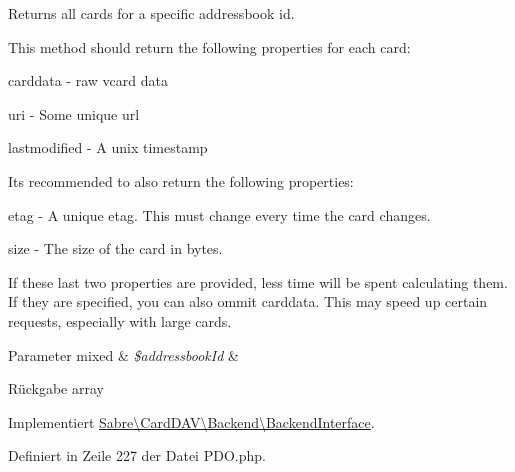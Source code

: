 Returns all cards for a specific addressbook id.

This method should return the following properties for each card\+:
\begin{DoxyItemize}
\item carddata -\/ raw vcard data
\item uri -\/ Some unique url
\item lastmodified -\/ A unix timestamp
\end{DoxyItemize}

It\textquotesingle{}s recommended to also return the following properties\+:
\begin{DoxyItemize}
\item etag -\/ A unique etag. This must change every time the card changes.
\item size -\/ The size of the card in bytes.
\end{DoxyItemize}

If these last two properties are provided, less time will be spent calculating them. If they are specified, you can also ommit carddata. This may speed up certain requests, especially with large cards.


\begin{DoxyParams}[1]{Parameter}
mixed & {\em \$addressbook\+Id} & \\
\hline
\end{DoxyParams}
\begin{DoxyReturn}{Rückgabe}
array 
\end{DoxyReturn}


Implementiert \mbox{\hyperlink{interface_sabre_1_1_card_d_a_v_1_1_backend_1_1_backend_interface_aa616e3059b786eb7d97340f8527c4e3c}{Sabre\textbackslash{}\+Card\+D\+A\+V\textbackslash{}\+Backend\textbackslash{}\+Backend\+Interface}}.



Definiert in Zeile 227 der Datei P\+D\+O.\+php.

\mbox{\label{class_sabre_1_1_card_d_a_v_1_1_backend_1_1_p_d_o_a6a70f8be9de0b90321638e8d57a9ab65}} 
